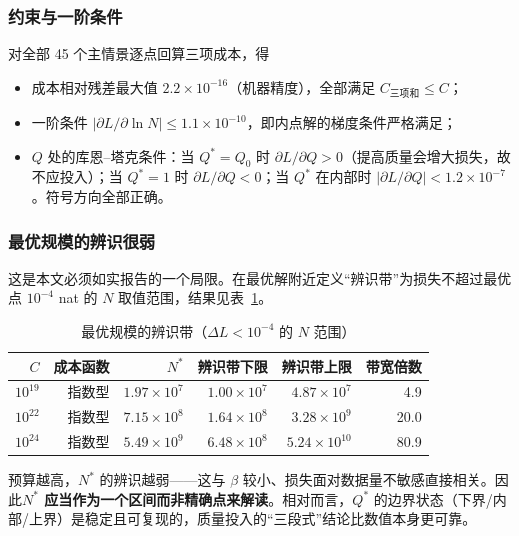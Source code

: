 \subsubsection{约束与一阶条件}

对全部 45 个主情景逐点回算三项成本，得

\begin{itemize}[leftmargin=2em,itemsep=2pt]
\item 成本相对残差最大值 $2.2\times10^{-16}$（机器精度），全部满足 $C_{\text{三项和}}\le C$；
\item 一阶条件 $|\partial L/\partial\ln N|\le1.1\times10^{-10}$，即内点解的梯度条件严格满足；
\item $Q$ 处的库恩--塔克条件：当 $Q^\ast=Q_0$ 时 $\partial L/\partial Q>0$（提高质量会增大损失，故不应投入）；当 $Q^\ast=1$ 时 $\partial L/\partial Q<0$；当 $Q^\ast$ 在内部时 $|\partial L/\partial Q|<1.2\times10^{-7}$。符号方向全部正确。
\end{itemize}

\subsubsection{最优规模的辨识很弱}

这是本文必须如实报告的一个局限。在最优解附近定义``辨识带''为损失不超过最优点 $10^{-4}$ nat 的 $N$ 取值范围，结果见表~\ref{tab:q3_band}。

\begin{table}[htbp]
\centering
\caption{最优规模的辨识带（$\Delta L<10^{-4}$ 的 $N$ 范围）}
\label{tab:q3_band}
\small
\begin{tabular}{r|r|r|r|r|r}
\toprule
$C$ & 成本函数 & $N^\ast$ & 辨识带下限 & 辨识带上限 & 带宽倍数 \\
\midrule
$10^{19}$ & 指数型 & $1.97\times10^{7}$ & $1.00\times10^{7}$ & $4.87\times10^{7}$ & 4.9 \\
$10^{22}$ & 指数型 & $7.15\times10^{8}$ & $1.64\times10^{8}$ & $3.28\times10^{9}$ & 20.0 \\
$10^{24}$ & 指数型 & $5.49\times10^{9}$ & $6.48\times10^{8}$ & $5.24\times10^{10}$ & 80.9 \\
\bottomrule
\end{tabular}
\end{table}

预算越高，$N^\ast$ 的辨识越弱——这与 $\beta$ 较小、损失面对数据量不敏感直接相关。因此\textbf{$N^\ast$ 应当作为一个区间而非精确点来解读}。相对而言，$Q^\ast$ 的边界状态（下界/内部/上界）是稳定且可复现的，质量投入的``三段式''结论比数值本身更可靠。

